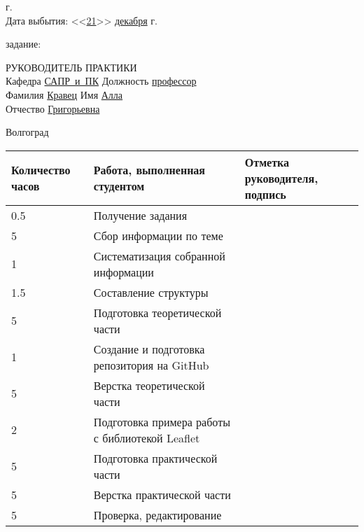 \documentclass[a4paper, 14pt]{extreport}
\begin{document}
\begin{titlepage}
\begin{flushleft}
            \the\year г.\\
            Дата выбытия: \hspace{3cm}<<\underline{21}>> \underline{декабря\hspace{1.4cm}} 
            \the\year г.
        \end{flushleft}
        \vspace{1cm}
         задание: \underline{\hspace{10.7cm}}\\
        \underline{\hspace{16.5cm}}
        \vspace{1cm}
        \begin{flushleft}
            РУКОВОДИТЕЛЬ ПРАКТИКИ\\
            Кафедра \underline{САПР~и~ПК\hspace{2.4cm}} Должность \underline{профессор\hspace{2.8cm}} \\
            Фамилия \underline{Кравец\hspace{3.3cm}} Имя \underline{Алла\hspace{5.5cm}}\\
            Отчество \underline{Григорьевна\hspace{2.2cm}}
        \end{flushleft}
        \vspace{\fill}
        \begin{center}
            Волгоград \the\year
        \end{center}
    \end{titlepage}
    \begin{table}[h!]
        \centering
        \begin{tabular}{|m{}|m{}|m{}|}
        \hline
        Количество часов & Работа, выполненная студентом & Отметка руководителя, подпись \\ \hline
        0.5 & Получение задания & \\ \hline
        5 & Сбор информации по теме & \\ \hline
        1 & Систематизация собранной информации & \\ \hline
        1.5 & Составление структуры & \\ \hline
        5 & Подготовка теоретической части & \\ \hline
        1 & Создание и подготовка репозитория на GitHub & \\ \hline
        5 & Верстка теоретической части & \\ \hline
        2 & Подготовка примера работы с библиотекой Leaflet & \\ \hline
        5 & Подготовка практической части & \\ \hline
        5 & Верстка практической части & \\ \hline
        5 & Проверка, редактирование & \\ \hline
        \end{tabular}
    \end{table}
\end{document}

